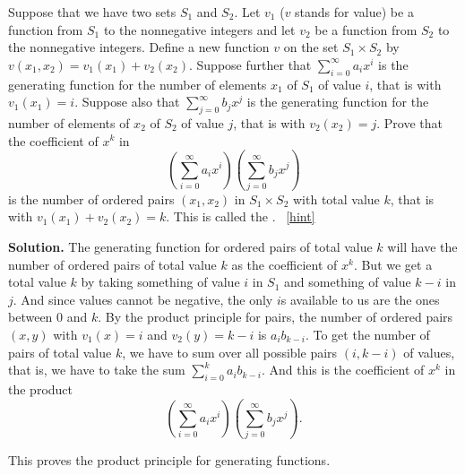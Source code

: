 \documentclass{book}
\begin{document}
\setcounter{project}{249}
\addtocounter{project}{-1}
\begin{activity}[]\label{ProductPrincipleOGF}
\hypertarget{p-1350}{}%
Suppose that we have two sets \(S_1\) and \(S_2\). Let \(v_1\) (\(v\) stands for value) be a function from \(S_1\) to the nonnegative integers and let \(v_2\) be a function from \(S_2\) to the nonnegative integers.  Define a new function \(v\) on the set \(S_1 \times S_2\) by \(v(x_1,x_2) = v_1(x_1) +v_2(x_2)\). Suppose further that \(\sum_{i=0}^\infty a_ix^i\) is the generating function for the number of elements \(x_1\) of \(S_1\) of value \(i\), that is with \(v_1(x_1)=i\). Suppose also that \(\sum_{j=0}^\infty b_j x^j\) is the generating function for the number of elements of \(x_2\) of \(S_2\) of value \(j\), that is with \(v_2(x_2) = j\).  Prove that the coefficient of \(x^k\) in%
\begin{equation*}
\left(\sum_{i=0}^\infty a_ix^i\right)\left(\sum_{j=0}^\infty
b_jx^j\right)
\end{equation*}
is the number of ordered pairs \((x_1,x_2)\) in \(S_1\times S_2\) with total value \(k\), that is with \(v_1(x_1) +v_2(x_2) =k\). This is called the .%
~\hfill{\tiny\hyperlink{a-249}{[hint]}\hypertarget{q-249}{}}\par\smallskip%
\noindent\textbf{Solution.}\hypertarget{solution-175}{}\quad%
\hypertarget{p-1352}{}%
The generating function for ordered pairs of total value \(k\) will have the number of ordered pairs of total value \(k\) as the coefficient of \(x^k\). But we get a total value \(k\) by taking something of value \(i\) in \(S_1\) and something of value \(k-i\) in \(j\). And since values cannot be negative, the only \(i\)s available to us are the ones between \(0\) and \(k\). By the product principle for pairs, the number of ordered pairs \((x,y)\) with \(v_1(x)=i\) and \(v_2(y)=k-i\) is \(a_ib_{k-i}\). To get the number of pairs of total value \(k\), we have to sum over all possible pairs \((i,k-i)\) of values, that is, we have to take the sum \(\sum_{i=0}^k a_ib_{k-i}\). And this is the coefficient of \(x^k\) in the product%
\begin{equation*}
\left(\sum_{i=0}^\infty a_ix^i\right)\left(\sum_{j=0}^\infty
b_jx^j\right).
\end{equation*}
%
\par
\hypertarget{p-1353}{}%
This proves the product principle for generating functions.%
\end{activity}
\end{document}
